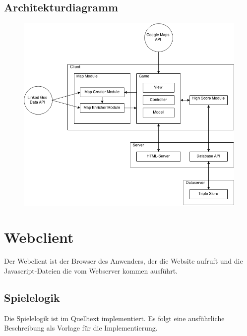 \documentclass{article}
\begin{document}
\subsection{Architekturdiagramm}
\begin{figure}[H]
  \centering
  \includegraphics[scale=0.5]{arch.png}
  \label{PNFs}
\end{figure} 


\section{Webclient}
Der Webclient ist der Browser des Anwenders, der die Website aufruft und die Javascript-Dateien die vom Webserver kommen ausführt. 

\subsection{Spielelogik}
Die Spielelogik ist im Quelltext implementiert.
Es folgt eine ausführliche Beschreibung als Vorlage für die Implementierung.
\end{document}

